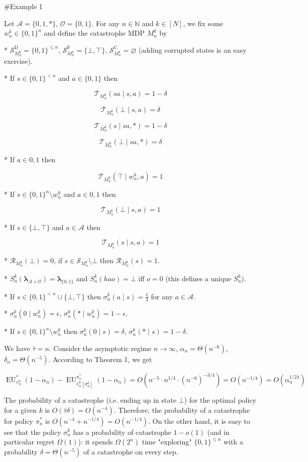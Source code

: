 \documentclass[a4paper]{article}
\newcommand{\Bool}{\{0,1\}}
\newcommand{\AP}[1]{\left(#1\right)}
\newcommand{\AB}[1]{\left[#1\right]}
\newcommand{\Nats}{\mathbb{N}}
\newcommand{\Estr}{\boldsymbol{\lambda}}
\newcommand{\Ob}{\mathcal{O}}
\newcommand{\A}{\mathcal{A}}
\newcommand{\St}{\mathcal{S}}
\newcommand{\T}{\mathcal{T}}
\newcommand{\R}{\mathcal{R}}
\newcommand{\RMC}{\mathrm{C}}
\newcommand{\RMD}{\mathrm{D}}
\newcommand{\RMF}{\mathrm{F}}
\newcommand{\SF}{\St^{\RMF}}
\newcommand{\SD}{\St^{\RMD}}
\newcommand{\SC}{\St^{\RMC}}
\newcommand{\EU}{\operatorname{EU}}
\begin{document}
\#Example 1

Let $\A = \{0,1,*\}$, $\Ob=\Bool$. For any $n \in \Nats$ and $k \in [N]$, we fix some $w_n^k \in \Bool^n$ and define the catastrophe MDP $M_n^k$ by

* $\SD_{M_n^k} = \Bool^{\leq n}$, $\SF_{M_n^k} = \{\bot,\top\}$, $\SC_{M_n^k} = \varnothing$ (adding corrupted states is an easy exercise).

* If $s \in \Bool^{< n}$ and $a \in \Bool$ then 

$$\T_{M_n^k}(sa \mid s,a) = 1 - \delta$$

$$\T_{M_n^k}(\bot \mid s,a) = \delta$$

$$\T_{M_n^k}(s \mid sa,*) = 1 - \delta$$

$$\T_{M_n^k}(\bot \mid sa,*) = \delta$$

* If $a \in {0,1}$ then

$$\T_{M_n^k}(\top \mid w_n^k,a) = 1$$

* If $s \in \Bool^n \setminus w_n^k$ and $a \in {0,1}$ then

$$\T_{M_n^k}(\bot \mid s,a) = 1$$

* If $s \in \{\bot,\top\}$ and $a \in \A$ then

$$\T_{M_n^k}(s \mid s,a) = 1$$

* $\R_{M_n^k}(\bot)=0$, if $s \in \St_{M_n^k} \setminus \bot$ then $\R_{M_n^k}(s)=1$.

* $S_n^k(\Estr_{\A \times \Ob})=\Estr_{\Bool}$ and $S_n^k(hao)=\bot$ iff $o = 0$ (this defines a unique $S_n^k$).

* If $s \in \Bool^{<n} \cup \{\bot,\top\}$ then $\sigma_n^k(a \mid s) = \frac{1}{3}$ for any $a \in \A$.

* $\sigma_n^k(0 \mid w_n^k) = \epsilon$, $\sigma_n^k(* \mid w_n^k) = 1 - \epsilon$.

* If $s \in \Bool^n \setminus w_n^k$ then $\sigma_n^k(0 \mid s) = \delta$, $\sigma_n^k(* \mid s) = 1 - \delta$.

We have $\bar{\tau} = n$. Consider the asymptotic regime $n \rightarrow \infty$, $\alpha_n = \Theta\AP{n^{-6}}$, $\delta_n = \Theta\AP{n^{-5}}$. According to Theorem 1, we get

$$\EU_{\upsilon_n^k}^*(1-\alpha_n) - \EU_{\bar{\upsilon}_n^k\AB{\sigma_n^k}}^{\pi_n^*}(1-\alpha_n) = O\AP{n^{-5} \cdot n^{1/4} \cdot \AP{n^{-6}}^{-3/4}}=O\AP{n^{-1/4}}=O\AP{\alpha_n^{1/24}}$$

The probability of a catastrophe (i.e. ending up in state $\bot$) for the optimal policy for a given $k$ is $O\AP{\bar{\tau}\delta}=O\AP{n^{-4}}$. Therefore, the probability of a catastrophe for policy $\pi_n^*$ is $O\AP{n^{-4}+n^{-1/4}}=O\AP{n^{-1/4}}$. On the other hand, it is easy to see that the policy $\sigma_n^k$ has a probability of catastrophe $1-o(1)$ (and in particular  regret $\Omega(1)$): it spends $\Omega(2^n)$ time "exploring" $\Bool^{\leq n}$ with a probability $\delta=\Theta\AP{n^{-5}}$ of a catastrophe on every step.
\end{document}
